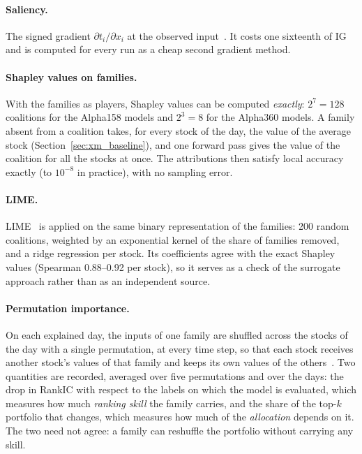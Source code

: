 \paragraph{Saliency.} The signed gradient $\partial t_i / \partial x_i$ at the observed input~\cite{simonyan2014deep}. It costs one sixteenth of IG and is computed for every run as a cheap second gradient method.

\paragraph{Shapley values on families.} With the families as players, Shapley values can be computed \emph{exactly}: $2^7 = 128$ coalitions for the Alpha158 models and $2^3 = 8$ for the Alpha360 models. A family absent from a coalition takes, for every stock of the day, the value of the average stock (Section~\ref{sec:xm_baseline}), and one forward pass gives the value of the coalition for all the stocks at once. The attributions then satisfy local accuracy exactly (to $10^{-8}$ in practice), with no sampling error.

\paragraph{LIME.} LIME~\cite{ribeiro2016lime} is applied on the same binary representation of the families: 200 random coalitions, weighted by an exponential kernel of the share of families removed, and a ridge regression per stock. Its coefficients agree with the exact Shapley values (Spearman 0.88--0.92 per stock), %
so it serves as a check of the surrogate approach rather than as an independent source.

\paragraph{Permutation importance.} On each explained day, the inputs of one family are shuffled across the stocks of the day with a single permutation, at every time step, so that each stock receives another stock's values of that family and keeps its own values of the others~\cite{breiman2001random,fisher2019all}. Two quantities are recorded, averaged over five permutations and over the days: the drop in RankIC with respect to the labels on which the model is evaluated, which measures how much \emph{ranking skill} the family carries, and the share of the top-$k$ portfolio that changes, which measures how much of the \emph{allocation} depends on it. The two need not agree: a family can reshuffle the portfolio without carrying any skill.

